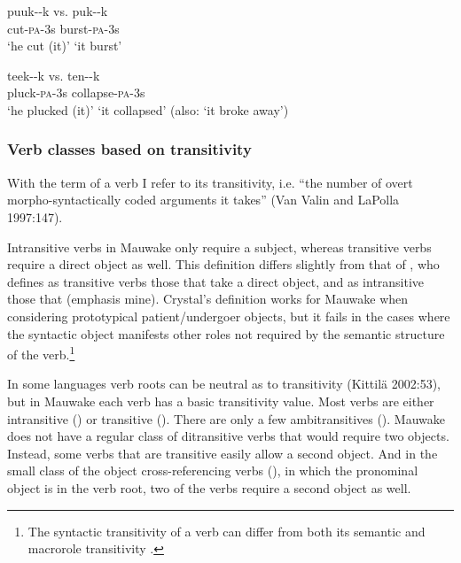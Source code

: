 \ea%
\label{ex:x255}
\gll puuk--k vs. puk--k \\
cut-\textsc{pa}-3s burst-\textsc{pa}-3s \\
\glt`he cut (it)' `it burst' 
\z

\ea%
\label{ex:x256}
\gll teek--k vs. ten--k \\
pluck-\textsc{pa}-3s collapse-\textsc{pa}-3s\\
\glt`he plucked (it)' `it collapsed' (also: `it broke away')
\z

\subsubsection[Verb classes based on transitivity]{Verb classes based on transitivity}
{}
With the term  of a verb I refer to its  transitivity, i.e. ``{the number of overt morpho-syntactically coded arguments it takes}'' (Van Valin and LaPolla 1997:147). 

Intransitive verbs in Mauwake only require a subject, whereas transitive verbs require a direct object as well. This definition differs slightly from that of \citet[397]{Crystal1997}, who defines as transitive verbs those that  take a direct object, and as intransitive those that  (emphasis mine). Crystal's definition works for Mauwake when considering prototypical patient/undergoer objects, but it fails in the cases where the syntactic object manifests other roles not required by the semantic structure of the verb.\footnote{The syntactic transitivity of a verb can differ from both its semantic and macrorole transitivity \citep{VanValinEtAl1997}.} 

In some languages verb roots can be neutral as to transitivity (Kittil\"a 2002:53), but in Mauwake each verb has a basic transitivity value. Most verbs are either intransitive () or transitive (). There are only a few ambitransitives (). Mauwake does not have a regular class of ditransitive verbs that would require two objects. Instead, some verbs that are transitive easily allow a second object. And in the small class of the object cross-referencing verbs (), in which the pronominal object is in the verb root, two of the verbs require a second object as well. 

